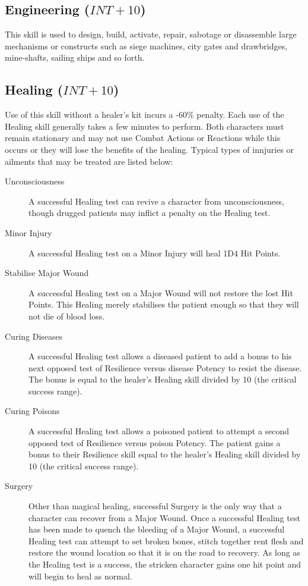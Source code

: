 \subsection{Engineering ($INT+10$)}
This skill is used to design, build, activate, repair, sabotage or disassemble large mechanisms or constructs such as siege machines, city gates and drawbridges, mine-shafts, sailing ships and so forth. 

\subsection{Healing ($INT+10$)}
Use of this skill without a healer’s kit incurs a -60\% penalty. Each use of the Healing skill generally takes a few minutes to perform. Both characters must remain stationary and may not use Combat Actions or Reactions while this occurs or they will lose the benefits of the healing. Typical types of innjuries or ailments that may be treated are listed below:

\begin{description}
\item[Unconsciousness] A successful Healing test can revive a character from unconsciousness, though drugged patients may inflict a penalty on the Healing test.
\item[Minor Injury] A successful Healing test on a Minor Injury will heal 1D4 Hit Points. 
\item[Stabilise Major Wound] A successful Healing test on a Major Wound will not restore the lost Hit Points. This Healing merely stabilises the patient enough so that they will not die of blood loss.
\item[Curing Diseases] A successful Healing test allows a diseased patient to add a bonus to his next opposed test of Resilience versus disease Potency to resist the disease. The bonus is equal to the healer’s Healing skill divided by 10 (the critical success range).
\item[Curing Poisons] A successful Healing test allows a poisoned patient to attempt a second opposed test of Resilience versus poison Potency. The patient gains a bonus to their Resilience skill equal to the healer’s Healing skill divided by 10 (the critical success range).
\item[Surgery] Other than magical healing, successful Surgery is the only way that a character can recover from a Major Wound. Once a successful Healing test has been made to quench the bleeding of a Major Wound, a successful Healing test can attempt to set broken bones, stitch together rent flesh and restore the wound location so that it is on the road to recovery. As long as the Healing test is a success, the stricken character gains one hit point and will begin to heal as normal.
\end{description}


